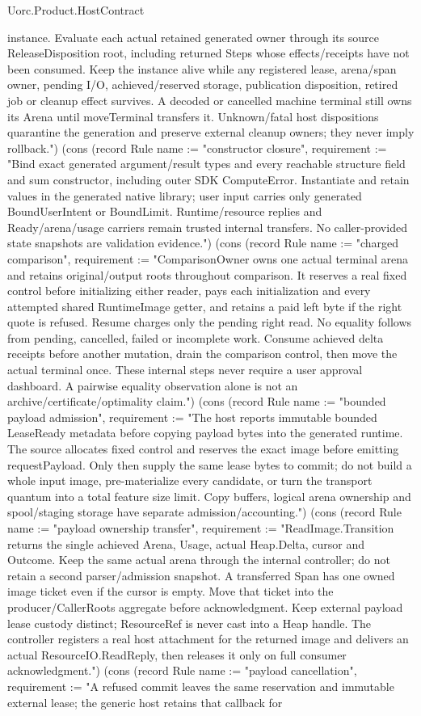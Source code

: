 \begin{lexlean}{Uorc.Product.HostContract}
\begin{semanticmodule}
{instance. Evaluate each actual retained generated owner through its source ReleaseDisposition root, including returned Steps whose effects/receipts have not been consumed. Keep the instance alive while any registered lease, arena/span owner, pending I/O, achieved/reserved storage, publication disposition, retired job or cleanup effect survives. A decoded or cancelled machine terminal still owns its Arena until moveTerminal transfers it. Unknown/fatal host dispositions quarantine the generation and preserve external cleanup owners; they never imply rollback."}) (cons (record Rule {name := "constructor closure", requirement := "Bind exact generated argument/result types and every reachable structure field and sum constructor, including outer SDK ComputeError. Instantiate and retain values in the generated native library; user input carries only generated BoundUserIntent or BoundLimit. Runtime/resource replies and Ready/arena/usage carriers remain trusted internal transfers. No caller-provided state snapshots are validation evidence."}) (cons (record Rule {name := "charged comparison", requirement := "ComparisonOwner owns one actual terminal arena and retains original/output roots throughout comparison. It reserves a real fixed control before initializing either reader, pays each initialization and every attempted shared RuntimeImage getter, and retains a paid left byte if the right quote is refused. Resume charges only the pending right read. No equality follows from pending, cancelled, failed or incomplete work. Consume achieved delta receipts before another mutation, drain the comparison control, then move the actual terminal once. These internal steps never require a user approval dashboard. A pairwise equality observation alone is not an archive/certificate/optimality claim."}) (cons (record Rule {name := "bounded payload admission", requirement := "The host reports immutable bounded LeaseReady metadata before copying payload bytes into the generated runtime. The source allocates fixed control and reserves the exact image before emitting requestPayload. Only then supply the same lease bytes to commit; do not build a whole input image, pre-materialize every candidate, or turn the transport quantum into a total feature size limit. Copy buffers, logical arena ownership and spool/staging storage have separate admission/accounting."}) (cons (record Rule {name := "payload ownership transfer", requirement := "ReadImage.Transition returns the single achieved Arena, Usage, actual Heap.Delta, cursor and Outcome. Keep the same actual arena through the internal controller; do not retain a second parser/admission snapshot. A transferred Span has one owned image ticket even if the cursor is empty. Move that ticket into the producer/CallerRoots aggregate before acknowledgment. Keep external payload lease custody distinct; ResourceRef is never cast into a Heap handle. The controller registers a real host attachment for the returned image and delivers an actual ResourceIO.ReadReply, then releases it only on full consumer acknowledgment."}) (cons (record Rule {name := "payload cancellation", requirement := "A refused commit leaves the same reservation and immutable external lease; the generic host retains that callback for }
\end{semanticmodule}
\end{lexlean}
